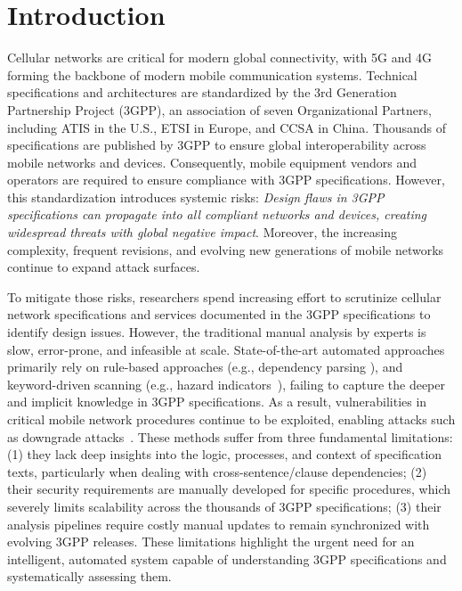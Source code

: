 \documentclass[sigconf]{acmart}
\begin{document}

\maketitle


\section{Introduction}

\noindent Cellular networks are critical for modern global connectivity, with 5G and 4G forming the backbone of modern mobile communication systems. Technical specifications and architectures are standardized by the 3rd Generation Partnership Project (3GPP), an association of seven Organizational Partners, including ATIS in the U.S., ETSI in Europe, and CCSA in China. Thousands of specifications are published by 3GPP to ensure global interoperability across mobile networks and devices.
Consequently, mobile equipment vendors and operators are required to ensure compliance with 3GPP specifications. However, this standardization introduces systemic risks: 
\textit{Design flaws in 3GPP specifications can propagate into all compliant networks and devices, creating widespread threats with global negative impact}. 
Moreover, the increasing complexity, frequent revisions, and evolving new generations of mobile networks continue to expand attack surfaces. 

To mitigate those risks, researchers spend increasing effort to scrutinize cellular network specifications and services documented in the 3GPP specifications to identify design issues. However, the traditional manual analysis by experts is slow, error-prone, and infeasible at scale. 
State-of-the-art automated approaches primarily rely on rule-based approaches (e.g., dependency parsing \cite{chen2021bookworm,al2024hermes}), and keyword-driven scanning (e.g., hazard indicators~\cite{chen2021bookworm}), failing to capture the deeper and implicit knowledge in 3GPP specifications.  
As a result, vulnerabilities in critical mobile network procedures continue to be exploited, enabling attacks such as downgrade attacks~\cite{shaik2015practical, chen2021bookworm, 6550445, kambourakis2011attacks,
      lee2009detection, leong2014unveiling, hussain20195greasoner,
      hussain2018lteinspector, kim2019touching, 8894379}. 
These methods suffer from three fundamental limitations: (1) they lack deep insights into the logic, processes, and context of specification texts, particularly when dealing with cross-sentence/clause dependencies; (2) their security requirements are manually developed for specific procedures, which severely limits scalability across the thousands of 3GPP specifications; (3) their analysis pipelines require costly manual updates to remain synchronized with evolving 3GPP releases.  
These limitations highlight the urgent need for an intelligent, automated system capable of understanding 3GPP specifications and systematically assessing them.  
\end{document}
